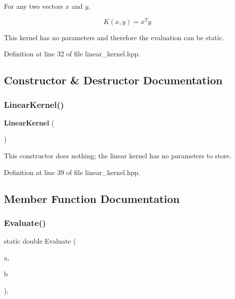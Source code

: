 For any two vectors $ x $ and $ y $,

\[ K(x, y) = x^T y \]

This kernel has no parameters and therefore the evaluation can be static. 

Definition at line 32 of file linear\+\_\+kernel.\+hpp.



\subsection{Constructor \& Destructor Documentation}
\mbox{\label{classmlpack_1_1kernel_1_1LinearKernel_a4250bde5222c9a9c476fcabe3cd1dc79}} 
\subsubsection{Linear\+Kernel()}
{\footnotesize\ttfamily \textbf{ Linear\+Kernel} (\begin{DoxyParamCaption}{ }\end{DoxyParamCaption})\hspace{0.3cm}{\ttfamily [inline]}}



This constructor does nothing; the linear kernel has no parameters to store. 



Definition at line 39 of file linear\+\_\+kernel.\+hpp.



\subsection{Member Function Documentation}
\mbox{\label{classmlpack_1_1kernel_1_1LinearKernel_a9cf31d3d6cf687f6f78a15ec94f46380}} 
\subsubsection{Evaluate()}
{\footnotesize\ttfamily static double Evaluate (\begin{DoxyParamCaption}\item[{const Vec\+TypeA \&}]{a,  }\item[{const Vec\+TypeB \&}]{b }\end{DoxyParamCaption})\hspace{0.3cm}{\ttfamily [inline]}, {\ttfamily [static]}}



